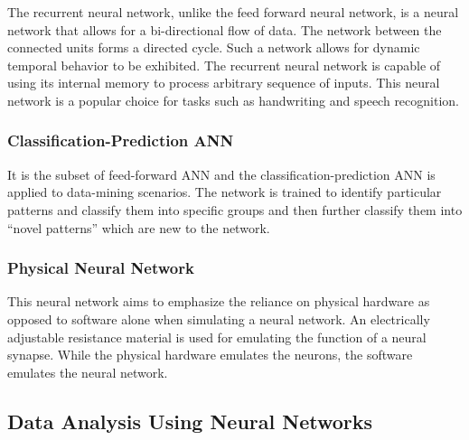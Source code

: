 The recurrent neural network, unlike the feed forward neural network, is a neural network that allows for a bi-directional flow of data. The network between the connected units forms a directed cycle. Such a network allows for dynamic temporal behavior to be exhibited. The recurrent neural network is capable of using its internal memory to process arbitrary sequence of inputs. This neural network is a popular choice for tasks such as handwriting and speech recognition.

\subsubsection{Classification-Prediction ANN}

It is the subset of feed-forward ANN and the classification-prediction ANN is applied to data-mining scenarios. The network is trained to identify particular patterns and classify them into specific groups and then further classify them into “novel patterns” which are new to the network.

\subsubsection{Physical Neural Network}

This neural network aims to emphasize the reliance on physical hardware as opposed to software alone when simulating a neural network. An electrically adjustable resistance material is used for emulating the function of a neural synapse. While the physical hardware emulates the neurons, the software emulates the neural network.

\subsection{Data Analysis Using Neural Networks}

